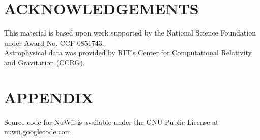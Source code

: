 \documentclass[a4paper,twoside]{article}
\begin{document}
\section*{\uppercase{Acknowledgements}}     This material is based upon work
supported by the National Science Foundation under Award No. CCF-0851743.\\ 
Astrophysical data was provided by RIT's Center for Computational Relativity
and Gravitation (CCRG).

\renewcommand{\baselinestretch}{0.98}  {\small
} \renewcommand{\baselinestretch}{1}

\section*{\uppercase{Appendix}} Source code for NuWii is available under the
GNU Public License at \url{nuwii.googlecode.com} 
\end{document}
